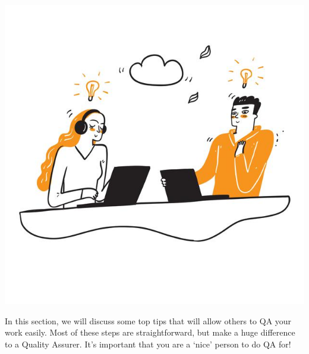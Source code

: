 \documentclass[
]{article}
\begin{document}
\includegraphics{pictures/together_pic.jpg}

In this section, we will discuss some top tips that will allow others to QA your work easily. Most of these steps are straightforward, but make a huge difference to a Quality Assurer. It's important that you are a `nice' person to do QA for!
\end{document}
